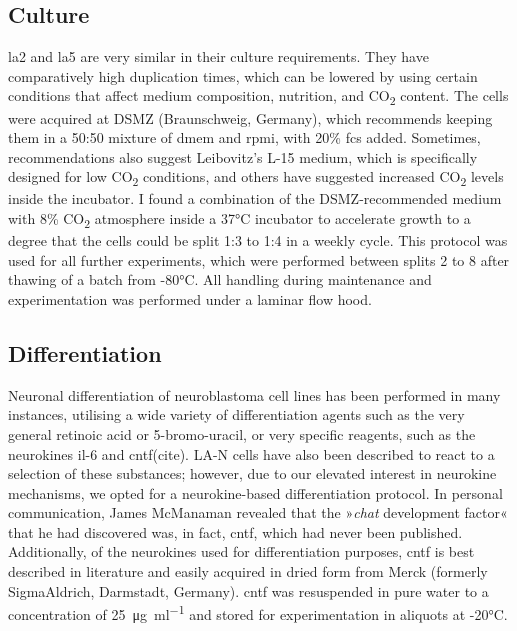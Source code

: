 \begin{method}

\subsection{Culture}

\ac{la2} and \ac{la5} are very similar in their culture requirements. They have comparatively high duplication times, which can be lowered by using certain conditions that affect medium composition, nutrition, and CO\textsubscript{2} content. The cells were acquired at DSMZ (Braunschweig, Germany), which recommends keeping them in a 50:50 mixture of \ac{dmem} and \ac{rpmi}, with 20\% \ac{fcs} added. Sometimes, recommendations also suggest Leibovitz's L-15 medium, which is specifically designed for low CO\textsubscript{2} conditions, and others have suggested increased CO\textsubscript{2} levels inside the incubator. I found a combination of the DSMZ-recommended medium with 8\% CO\textsubscript{2} atmosphere inside a 37°C incubator to accelerate growth to a degree that the cells could be split 1:3 to 1:4 in a weekly cycle. This protocol was used for all further experiments, which were performed between splits 2 to 8 after thawing of a batch from -80°C. All handling during maintenance and experimentation was performed under a laminar flow hood.

\subsection{Differentiation}

Neuronal differentiation of neuroblastoma cell lines has been performed in many instances, utilising a wide variety of differentiation agents such as the very general retinoic acid or 5-bromo-uracil, or very specific reagents, such as the neurokines \ac{il}-6 and \ac{cntf}(cite). LA-N cells have also been described to react to a selection of these substances; however, due to our elevated interest in neurokine mechanisms, we opted for a neurokine-based differentiation protocol. In personal communication, James McManaman revealed that the »\textit{\ac{chat}} development factor« that he had discovered\cite{McManaman1988} was, in fact, \ac{cntf}, which had never been published. Additionally, of the neurokines used for differentiation purposes, \ac{cntf} is best described in literature and easily acquired in dried form from Merck (formerly SigmaAldrich, Darmstadt, Germany). \ac{cntf} was resuspended in pure water to a concentration of \SI{25}{\micro\gram\per\milli\litre} and stored for experimentation in aliquots at -20°C.


\end{method}
